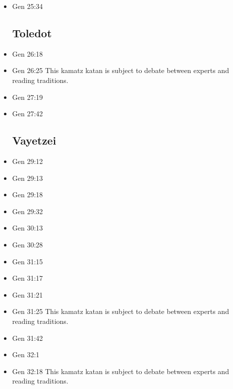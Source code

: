 \documentclass[14pt]{book}
\begin{document}
\begin{multicols}{2}
\begin{itemize}
\item Gen 25:34

\subsection{Toledot}

\item Gen 26:18

\item Gen 26:25 This kamatz katan is subject to debate between experts and reading traditions.

\item Gen 27:19

\item Gen 27:42

\subsection{Vayetzei}

\item Gen 29:12

\item Gen 29:13

\item Gen 29:18

\item Gen 29:32

\item Gen 30:13

\item Gen 30:28

\item Gen 31:15

\item Gen 31:17

\item Gen 31:21

\item Gen 31:25 This kamatz katan is subject to debate between experts and reading traditions.

\item Gen 31:42

\item Gen 32:1

\item Gen 32:18 This kamatz katan is subject to debate between experts and reading traditions.


\end{itemize}
\end{multicols}
\end{document}

